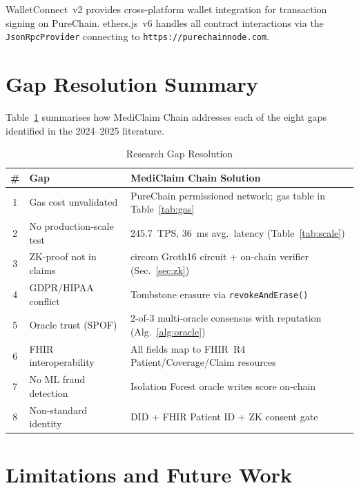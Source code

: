 \documentclass[journal]{IEEEtran}
\begin{document}
WalletConnect~v2 provides cross-platform wallet integration for transaction
signing on PureChain. ethers.js~v6 handles all contract interactions via the
\texttt{JsonRpcProvider} connecting to \texttt{https://purechainnode.com}.

\section{Gap Resolution Summary}
\label{sec:gaps}

Table~\ref{tab:gaps} summarises how MediClaim Chain addresses each of the
eight gaps identified in the 2024--2025 literature.

\begin{table}[h]
\centering
\caption{Research Gap Resolution}
\label{tab:gaps}
\begin{tabular}{@{}cp{3.8cm}p{3.8cm}@{}}
\toprule
\# & Gap & MediClaim Chain Solution \\
\midrule
1 & Gas cost unvalidated & PureChain permissioned network; gas table in Table~\ref{tab:gas} \\
2 & No production-scale test & 245.7~TPS, 36~ms avg.\ latency (Table~\ref{tab:scale}) \\
3 & ZK-proof not in claims & circom Groth16 circuit + on-chain verifier (Sec.~\ref{sec:zk}) \\
4 & GDPR/HIPAA conflict & Tombstone erasure via \texttt{revokeAndErase()} \\
5 & Oracle trust (SPOF) & 2-of-3 multi-oracle consensus with reputation (Alg.~\ref{alg:oracle}) \\
6 & FHIR interoperability & All fields map to FHIR~R4 Patient/Coverage/Claim resources \\
7 & No ML fraud detection & Isolation Forest oracle writes score on-chain \\
8 & Non-standard identity & DID + FHIR Patient ID + ZK consent gate \\
\bottomrule
\end{tabular}
\end{table}

\section{Limitations and Future Work}
\label{sec:limits}
\end{document}
